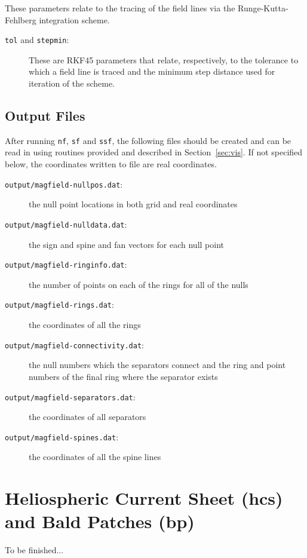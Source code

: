 \documentclass[12pt]{article}
\begin{document}
        These parameters relate to the tracing of the field lines via the Runge-Kutta-Fehlberg integration scheme.
        \begin{description}
          \item [\texttt{tol} and \texttt{stepmin}:] These are RKF45 parameters that relate, respectively, to the tolerance to which a field line is traced and the minimum step distance used for iteration of the scheme.
        \end{description}

    \subsection{Output Files}

      After running \texttt{nf}, \texttt{sf} and \texttt{ssf}, the following files should be created and can be read in using routines provided and described in Section~\ref{sec:vis}. If not specified below, the coordinates written to file are real coordinates.
      \begin{description}
        \item [\texttt{output/magfield-nullpos.dat}:] the null point locations in both grid and real coordinates
        \item [\texttt{output/magfield-nulldata.dat}:] the sign and spine and fan vectors for each null point
        \item [\texttt{output/magfield-ringinfo.dat}:] the number of points on each of the rings for all of the nulls
        \item [\texttt{output/magfield-rings.dat}:] the coordinates of all the rings
        \item [\texttt{output/magfield-connectivity.dat}:] the null numbers which the separators connect and the ring and point numbers of the final ring where the separator exists
        \item [\texttt{output/magfield-separators.dat}:] the coordinates of all separators
        \item [\texttt{output/magfield-spines.dat}:] the coordinates of all the spine lines
      \end{description}

  \section{Heliospheric Current Sheet (hcs) and Bald Patches (bp)}

    To be finished...
\end{document}
